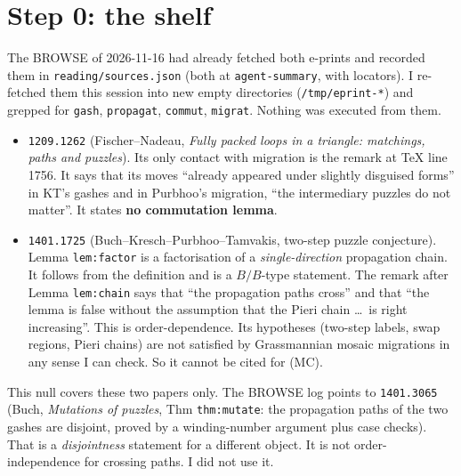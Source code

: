 \documentclass[11pt]{article}
\theoremstyle{definition}
\begin{document}
\section{Step 0: the shelf}\label{sec:shelf}
The BROWSE of 2026-11-16 had already fetched both e-prints and recorded them in \texttt{reading/sources.json} (both at
\texttt{agent-summary}, with locators). I re-fetched them this session into new empty directories (\texttt{/tmp/eprint-*}) and grepped
for \texttt{gash}, \texttt{propagat}, \texttt{commut}, \texttt{migrat}. Nothing was executed from them.
\begin{itemize}
\item \texttt{1209.1262} (Fischer--Nadeau, \emph{Fully packed loops in a triangle: matchings, paths and puzzles}). Its only contact with
migration is the remark at TeX line 1756. It says that its moves ``already appeared under slightly disguised forms'' in KT's gashes and in
Purbhoo's migration, ``the intermediary puzzles do not matter''. It states \textbf{no commutation lemma}.
\item \texttt{1401.1725} (Buch--Kresch--Purbhoo--Tamvakis, two-step puzzle conjecture). Lemma \texttt{lem:factor} is a factorisation of a
\emph{single-direction} propagation chain. It follows from the definition and is a $B/B$-type statement. The remark after Lemma
\texttt{lem:chain} says that ``the propagation paths cross'' and that ``the lemma is false without the assumption that the Pieri chain
\ldots\ is right increasing''. This is order-dependence. Its hypotheses (two-step labels, swap regions, Pieri chains) are not satisfied
by Grassmannian mosaic migrations in any sense I can check. So it cannot be cited for (MC).
\end{itemize}
This null covers these two papers only. The BROWSE log points to \texttt{1401.3065} (Buch, \emph{Mutations of puzzles}, Thm
\texttt{thm:mutate}: the propagation paths of the two gashes are disjoint, proved by a winding-number argument plus case checks). That is a
\emph{disjointness} statement for a different object. It is not order-independence for crossing paths. I did not use it.
\end{document}

